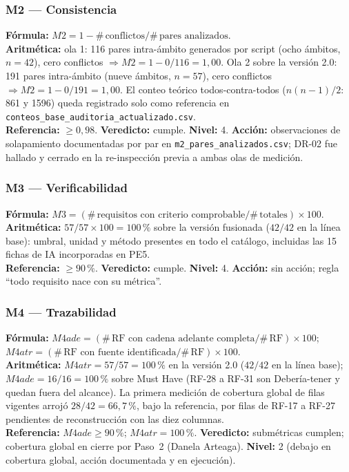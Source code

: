 \subsubsection*{M2 --- Consistencia}
\textbf{F\'ormula:} $M2 = 1 - \#\,\text{conflictos}/\#\,\text{pares analizados}$.\\
\textbf{Aritm\'etica:} ola 1: 116 pares intra-\'ambito generados por script (ocho \'ambitos, $n=42$), cero conflictos $\Rightarrow M2 = 1 - 0/116 = 1{,}00$. Ola 2 sobre la versi\'on 2.0: 191 pares intra-\'ambito (nueve \'ambitos, $n=57$), cero conflictos $\Rightarrow M2 = 1 - 0/191 = 1{,}00$. El conteo te\'orico todos-contra-todos ($n(n-1)/2$: 861 y 1596) queda registrado solo como referencia en \texttt{conteos\_base\_auditoria\_actualizado.csv}.\\
\textbf{Referencia:} $\geq0{,}98$. \textbf{Veredicto:} cumple. \textbf{Nivel:} 4. \textbf{Acci\'on:} observaciones de solapamiento documentadas por par en \texttt{m2\_pares\_analizados.csv}; DR-02 fue hallado y cerrado en la re-inspecci\'on previa a ambas olas de medici\'on.

\subsubsection*{M3 --- Verificabilidad}
\textbf{F\'ormula:} $M3 = (\#\,\text{requisitos con criterio comprobable}/\#\,\text{totales})\times100$.\\
\textbf{Aritm\'etica:} $57/57\times100 = 100\,\%$ sobre la versi\'on fusionada ($42/42$ en la l\'inea base): umbral, unidad y m\'etodo presentes en todo el cat\'alogo, incluidas las 15 fichas de IA incorporadas en PE5.\\
\textbf{Referencia:} $\geq90\,\%$. \textbf{Veredicto:} cumple. \textbf{Nivel:} 4. \textbf{Acci\'on:} sin acci\'on; regla ``todo requisito nace con su m\'etrica''.

\subsubsection*{M4 --- Trazabilidad}
\textbf{F\'ormula:} $M4ade = (\#\,\text{RF con cadena adelante completa}/\#\,\text{RF})\times100$; $M4atr = (\#\,\text{RF con fuente identificada}/\#\,\text{RF})\times100$.\\
\textbf{Aritm\'etica:} $M4atr = 57/57 = 100\,\%$ en la versi\'on 2.0 ($42/42$ en la l\'inea base); $M4ade = 16/16 = 100\,\%$ sobre Must Have (RF-28 a RF-31 son Deber\'ia-tener y quedan fuera del alcance). La primera medici\'on de cobertura global de filas vigentes arroj\'o $28/42 = 66{,}7\,\%$, bajo la referencia, por filas de RF-17 a RF-27 pendientes de reconstrucci\'on con las diez columnas.\\
\textbf{Referencia:} $M4ade\geq90\,\%$; $M4atr=100\,\%$. \textbf{Veredicto:} subm\'etricas cumplen; cobertura global en cierre por Paso~2 (Danela Arteaga). \textbf{Nivel:} 2 (debajo en cobertura global, acci\'on documentada y en ejecuci\'on).

